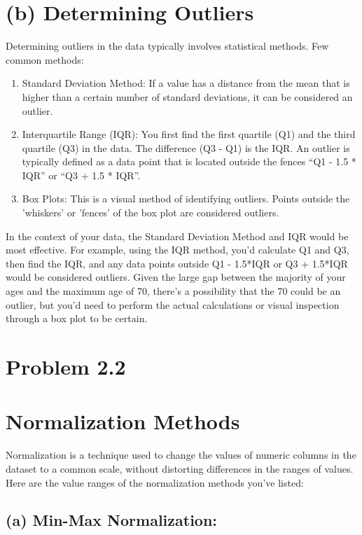 \documentclass{article}
\begin{document}
\section*{(b) Determining Outliers}

Determining outliers in the data typically involves statistical methods. Few common methods:

\begin{enumerate}
  \item Standard Deviation Method: If a value has a distance from the mean that is higher than a certain number of standard deviations, it can be considered an outlier.
  \item Interquartile Range (IQR): You first find the first quartile (Q1) and the third quartile (Q3) in the data. The difference (Q3 - Q1) is the IQR. An outlier is typically defined as a data point that is located outside the fences ``Q1 - 1.5 * IQR'' or ``Q3 + 1.5 * IQR''.
  \item Box Plots: This is a visual method of identifying outliers. Points outside the 'whiskers' or 'fences' of the box plot are considered outliers.
\end{enumerate}

In the context of your data, the Standard Deviation Method and IQR would be most effective. For example, using the IQR method, you'd calculate Q1 and Q3, then find the IQR, and any data points outside Q1 - 1.5*IQR or Q3 + 1.5*IQR would be considered outliers. Given the large gap between the majority of your ages and the maximum age of 70, there's a possibility that the 70 could be an outlier, but you'd need to perform the actual calculations or visual inspection through a box plot to be certain.

\section*{Problem 2.2}

\section*{Normalization Methods}

Normalization is a technique used to change the values of numeric columns in the dataset to a common scale, without distorting differences in the ranges of values. Here are the value ranges of the normalization methods you've listed:

\subsection*{(a) Min-Max Normalization:}
\end{document}

